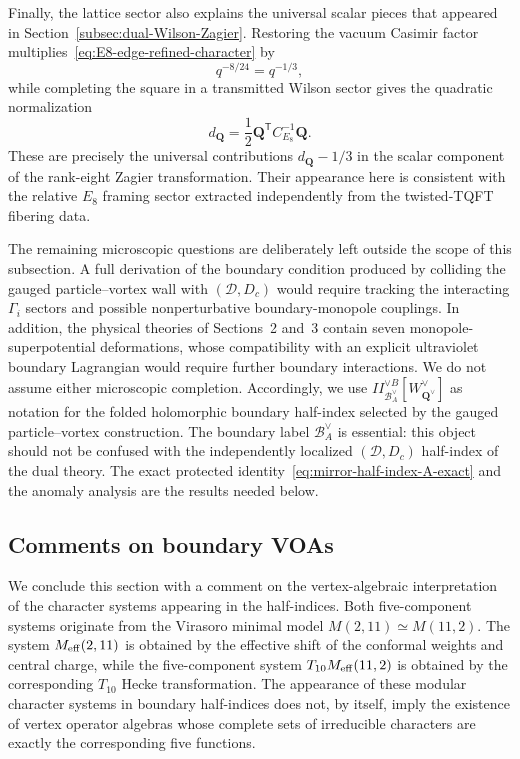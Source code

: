 \documentclass[11pt,a4paper]{article}
\numberwithin{equation}{section}
\begin{document}
Finally, the lattice sector also explains the universal scalar pieces that appeared in Section~\ref{subsec:dual-Wilson-Zagier}.  Restoring the vacuum Casimir factor multiplies~\eqref{eq:E8-edge-refined-character} by
\begin{equation}
  q^{-8/24}=q^{-1/3},
  \label{eq:E8-edge-Casimir-shift}
\end{equation}
while completing the square in a transmitted Wilson sector gives the quadratic normalization
\begin{equation}
  d_{\boldsymbol Q}
  =\frac12\boldsymbol Q^{\mathsf T}C_{E_8}^{-1}\boldsymbol Q.
  \label{eq:edge-Wilson-quadratic-shift}
\end{equation}
These are precisely the universal contributions $d_{\boldsymbol Q}-1/3$ in the scalar component of the rank-eight Zagier transformation.  Their appearance here is consistent with the relative $E_8$ framing sector extracted independently from the twisted-TQFT fibering data.

The remaining microscopic questions are deliberately left outside the scope of this subsection.  A full derivation of the boundary condition produced by colliding the gauged particle--vortex wall with $(\mathcal D,D_c)$ would require tracking the interacting $\Gamma_i$ sectors and possible nonperturbative boundary-monopole couplings.  In addition, the physical theories of Sections~2 and~3 contain seven monopole-superpotential deformations, whose compatibility with an explicit ultraviolet boundary Lagrangian would require further boundary interactions.  We do not assume either microscopic completion.  Accordingly, we use $I\!\!I_{\mathcal B_A^\vee}^{\vee B}[W^\vee_{\boldsymbol Q^\vee}]$ as notation for the folded holomorphic boundary half-index selected by the gauged particle--vortex construction.  The boundary label $\mathcal B_A^\vee$ is essential: this object should not be confused with the independently localized $(\mathcal D,D_c)$ half-index of the dual theory.  The exact protected identity~\eqref{eq:mirror-half-index-A-exact} and the anomaly analysis are the results needed below.


\subsection{Comments on boundary VOAs}
\label{subsec:boundary-VOA-comments}

We conclude this section with a comment on the vertex-algebraic interpretation of the character systems appearing in the half-indices.  Both five-component systems originate from the Virasoro minimal model $M(2,11)\simeq M(11,2)$.  The system $M_{\rm eff}(2,11)$ is obtained by the effective shift of the conformal weights and central charge, while the five-component system $T_{10}M_{\rm eff}(11,2)$ is obtained by the corresponding $T_{10}$ Hecke transformation.  The appearance of these modular character systems in boundary half-indices does not, by itself, imply the existence of vertex operator algebras whose complete sets of irreducible characters are exactly the corresponding five functions.
\end{document}
